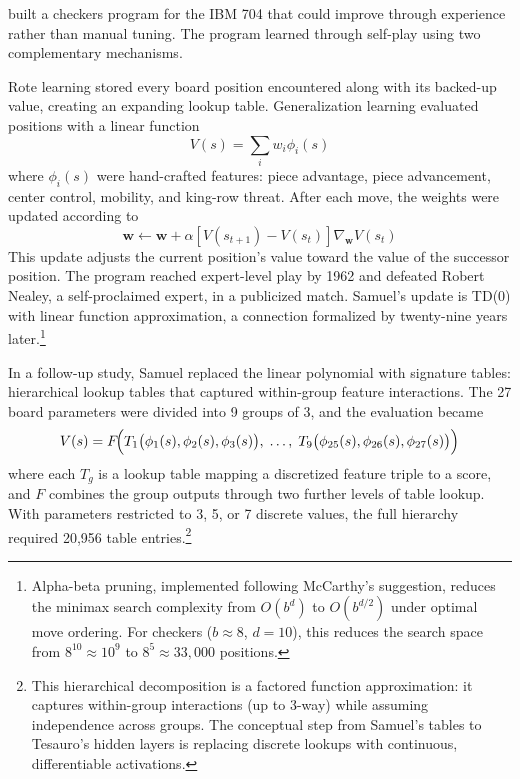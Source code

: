 \citet{Samuel1959} built a checkers program for the IBM 704 that could improve through experience rather than manual tuning. The program learned through self-play using two complementary mechanisms.

Rote learning stored every board position encountered along with its backed-up value, creating an expanding lookup table. Generalization learning evaluated positions with a linear function
\begin{equation}
V(s) = \sum_{i} w_i \phi_i(s)
\end{equation}
where $\phi_i(s)$ were hand-crafted features: piece advantage, piece advancement, center control, mobility, and king-row threat. After each move, the weights were updated according to
\begin{equation}
\mathbf{w} \leftarrow \mathbf{w} + \alpha \left[ V(s_{t+1}) - V(s_t) \right] \nabla_{\mathbf{w}} V(s_t)
\end{equation}
This update adjusts the current position's value toward the value of the successor position. The program reached expert-level play by 1962 and defeated Robert Nealey, a self-proclaimed expert, in a publicized match. Samuel's update is TD(0) with linear function approximation, a connection formalized by \citet{sutton1988} twenty-nine years later.\footnote{Alpha-beta pruning, implemented following McCarthy's suggestion, reduces the minimax search complexity from $O(b^d)$ to $O(b^{d/2})$ under optimal move ordering. For checkers ($b \approx 8$, $d = 10$), this reduces the search space from $8^{10} \approx 10^9$ to $8^5 \approx 33{,}000$ positions.}

In a follow-up study, Samuel replaced the linear polynomial with signature tables: hierarchical lookup tables that captured within-group feature interactions. The 27 board parameters were divided into 9 groups of 3, and the evaluation became
\begin{equation}
V(s) = F\!\Bigl(T_1\bigl(\phi_1(s), \phi_2(s), \phi_3(s)\bigr),\; \ldots,\; T_9\bigl(\phi_{25}(s), \phi_{26}(s), \phi_{27}(s)\bigr)\Bigr)
\end{equation}
where each $T_g$ is a lookup table mapping a discretized feature triple to a score, and $F$ combines the group outputs through two further levels of table lookup. With parameters restricted to 3, 5, or 7 discrete values, the full hierarchy required 20{,}956 table entries.\footnote{This hierarchical decomposition is a factored function approximation: it captures within-group interactions (up to 3-way) while assuming independence across groups. The conceptual step from Samuel's tables to Tesauro's hidden layers is replacing discrete lookups with continuous, differentiable activations.}

